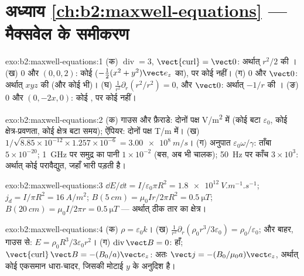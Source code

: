 \section*{अध्याय \ref{ch:b2:maxwell-equations} --- मैक्सवेल के समीकरण}

\begin{solution}{exo:b2:maxwell-equations:1}
(क) $\operatorname{div} = 3$, $\operatorname{\vect{curl}} = \vect 0$: अर्थात् $r^2/2$ की ।
(ख) $0$ और $(0, 0, 2)$: कोई  ($-\tfrac12(x^2 + y^2)\vect e_z$ का), पर कोई
 नहीं। (ग) $0$ और $\vect 0$: अर्थात् $xyz$ की  (और कोई  भी)। (घ)
$\frac1{r^2}\partial_r(r^2/r^2) = 0$, और  $\vect 0$: अर्थात् $-1/r$ की । (ङ)
$0$ और $(0, -2x, 0)$: कोई , पर कोई  नहीं।
\end{solution}

\begin{solution}{exo:b2:maxwell-equations:2}
(क) गाउस और फ़ैराडे: दोनों पक्ष \unit{V/m^2} में (कोई  बटा
$\varepsilon_0$, कोई क्षेत्र-प्रवणता, कोई क्षेत्र बटा समय); ऐंपियर: दोनों पक्ष
\unit{T/m} में।
(ख) $1/\sqrt{8.85 \times 10^{-12} \times 1.257 \times 10^{-6}} = \qty{3.00e8}{m/s}$। (ग) अनुपात
$\varepsilon_0\omega/\gamma$: ताँबा $5 \times 10^{-20}$; \qty{1}{GHz} पर समुद्र का पानी $1 \times 10^{-2}$
(बस, अब भी चालक); \qty{50}{Hz} पर काँच $3 \times 10^3$: अर्थात् कोई परावैद्युत,
जहाँ  भारी पड़ती है।
\end{solution}

\begin{solution}{exo:b2:maxwell-equations:3}
$\dd E/\dd t = I/\varepsilon_0\pi R^2 = \qty{1.8e12}{V.m^{-1}.s^{-1}}$; $j_d = I/\pi R^2 =
\qty{16}{A/m^2}$; $B(\qty{5}{cm}) = \mu_0Ir/2\pi R^2 = \qty{0.5}{\micro T}$; $B(\qty{20}{cm}) =
\mu_0I/2\pi r = \qty{0.5}{\micro T}$ --- अर्थात् ठीक तार का क्षेत्र।
\end{solution}

\begin{solution}{exo:b2:maxwell-equations:4}
(क) $\rho = \varepsilon_0k$। (ख) $\frac1{r^2}\partial_r(\rho_0r^3/3\varepsilon_0) = \rho_0/\varepsilon_0$;
और बाहर, गाउस से: $E = \rho_0R^3/3\varepsilon_0r^2$। (ग) $\operatorname{div}\vect B = 0$: हाँ;
$\operatorname{\vect{curl}}\vect B = -(B_0/a)\vect e_z$: अतः $\vect j = -(B_0/\mu_0a)\vect e_z$, अर्थात् कोई
एकसमान धारा-चादर, जिसकी मोटाई $y$ के अनुदिश है।
\end{solution}

